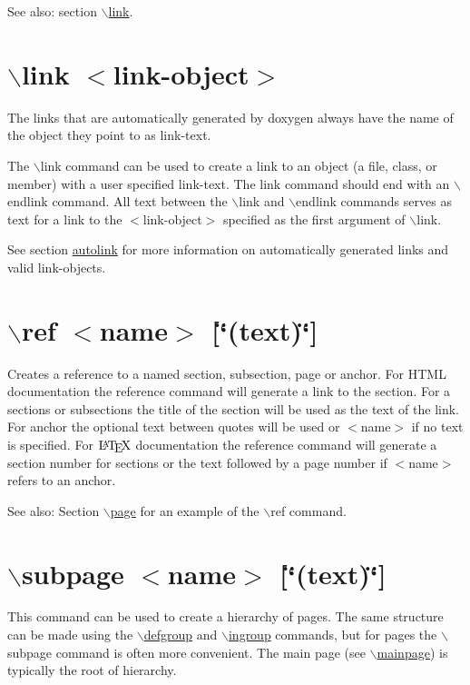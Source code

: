 \begin{Desc}
\item[See also:]section \hyperlink{commands_cmdlink}{$\backslash$link}.\end{Desc}


 \hypertarget{commands_cmdlink}{}\section{$\backslash$link $<$link-object$>$}\label{commands_cmdlink}
 The links that are automatically generated by doxygen always have the name of the object they point to as link-text.

The $\backslash$link command can be used to create a link to an object (a file, class, or member) with a user specified link-text. The link command should end with an $\backslash$endlink command. All text between the $\backslash$link and $\backslash$endlink commands serves as text for a link to the $<$link-object$>$ specified as the first argument of $\backslash$link.

See section \hyperlink{autolink}{autolink} for more information on automatically generated links and valid link-objects.



 \hypertarget{commands_cmdref}{}\section{$\backslash$ref $<$name$>$ \mbox{[}\char`\"{}(text)\char`\"{}\mbox{]}}\label{commands_cmdref}
 Creates a reference to a named section, subsection, page or anchor. For HTML documentation the reference command will generate a link to the section. For a sections or subsections the title of the section will be used as the text of the link. For anchor the optional text between quotes will be used or $<$name$>$ if no text is specified. For $\mbox{\LaTeX}$ documentation the reference command will generate a section number for sections or the text followed by a page number if $<$name$>$ refers to an anchor.

\begin{Desc}
\item[See also:]Section \hyperlink{commands_cmdpage}{$\backslash$page} for an example of the $\backslash$ref command.\end{Desc}


 \hypertarget{commands_cmdsubpage}{}\section{$\backslash$subpage $<$name$>$ \mbox{[}\char`\"{}(text)\char`\"{}\mbox{]}}\label{commands_cmdsubpage}
 This command can be used to create a hierarchy of pages. The same structure can be made using the \hyperlink{commands_cmddefgroup}{$\backslash$defgroup} and \hyperlink{commands_cmdingroup}{$\backslash$ingroup} commands, but for pages the $\backslash$subpage command is often more convenient. The main page (see \hyperlink{commands_cmdmainpage}{$\backslash$mainpage}) is typically the root of hierarchy.

